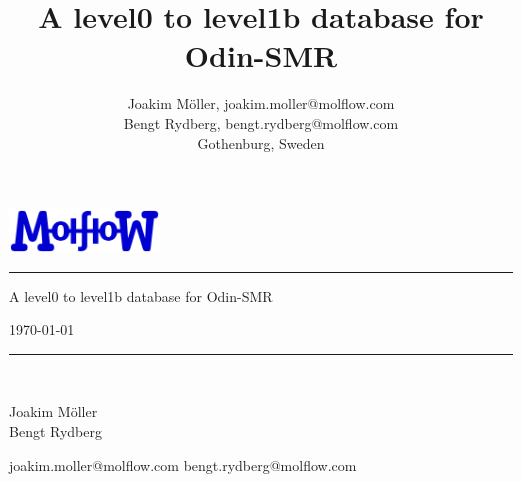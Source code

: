 \documentclass[12pt]{article}
\begin{document}
\fancyhead[CE,CO]{}
\fancyhead[RE,RO]{\bfseries\nouppercase\leftmark}
\fancyfoot[LO,LE]{}
\fancyfoot[RO,RE]{}
\fancyfoot[CO,CE]{}
\renewcommand{\footrulewidth}{0.4pt}
\renewcommand{\headrulewidth}{0.4pt}

\title{A level0 to level1b database for Odin-SMR\\
       \vspace*{85mm}}
\author{
	Joakim M\"{o}ller, joakim.moller@molflow.com\\
        Bengt Rydberg, bengt.rydberg@molflow.com\\
        Gothenburg, Sweden\\
        }

\begin{titlepage}
	    \includegraphics[width=0.3\textwidth]{molflow.png}
  \begin{flushright}
    \noindent\rule{\textwidth}{2pt}
    \vspace{1cm}
    \begin{huge}
	   A level0 to level1b database for Odin-SMR\\
    \end{huge}
      \vspace{1cm}
    \today\\
    \noindent\rule{\textwidth}{2pt}
    \vspace{1cm}\\
    \begin{minipage}[t]{0.3\textwidth}
    \end{minipage}%
    \begin{minipage}[t]{0.30\textwidth}
	Joakim M\"{o}ller\\
        Bengt Rydberg
    \end{minipage}%
    \begin{minipage}[t]{0.4\textwidth}
      \begin{flushright}
        joakim.moller@molflow.com
	bengt.rydberg@molflow.com
      \end{flushright}
\end{minipage}
  \vspace{8cm}
\end{flushright}
\end{titlepage}
\end{document}
